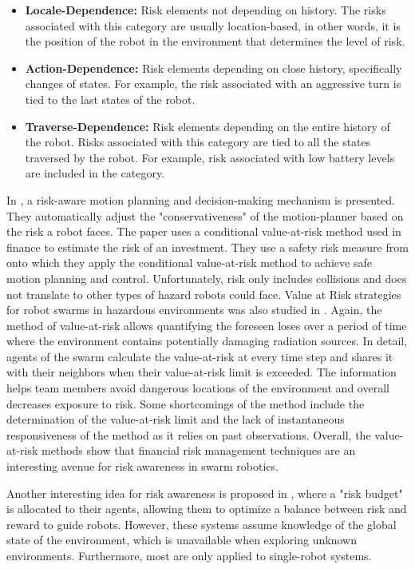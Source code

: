 \begin{itemize}
    \item \textbf{Locale-Dependence:} Risk elements not depending on history. The risks associated with this category are usually location-based, in other words, it is the position of the robot in the environment that determines the level of risk. 
    \item \textbf{Action-Dependence:} Risk elements depending on close history, specifically changes of states. For example, the risk associated with an aggressive turn is tied to the last states of the robot.   
    \item \textbf{Traverse-Dependence:} Risk elements depending on the entire history of the robot. Risks associated with this category are tied to all the states traversed by the robot. For example, risk associated with low battery levels are included in the category.  
\end{itemize}

In \cite{hakobyan2019risk}, a risk-aware motion planning and decision-making mechanism is presented. They automatically adjust the "conservativeness" of the motion-planner based on the risk a robot faces. The paper uses a conditional value-at-risk method used in finance to estimate the risk of an investment. They use a safety risk measure from \cite{samuelson2018safety} onto which they apply the conditional value-at-risk method to achieve safe motion planning and control. Unfortunately, risk only includes collisions and does not translate to other types of hazard robots could face. Value at Risk strategies for robot swarms in hazardous environments was also studied in \cite{hunt2021value}. Again, the method of value-at-risk allows quantifying the foreseen loses over a period of time where the environment contains potentially damaging radiation sources. In detail, agents of the swarm calculate the value-at-risk at every time step and shares it with their neighbors when their value-at-risk limit is exceeded. The information helps team members avoid dangerous locations of the environment and overall decreases exposure to risk. Some shortcomings of the method include the determination of the value-at-risk limit and the lack of instantaneous responsiveness of the method as it relies on past observations. Overall, the value-at-risk methods show that financial risk management techniques are an interesting avenue for risk awareness in swarm robotics.

Another interesting idea for risk awareness is proposed in \cite{ono2008efficient,vitus2011feedback}, where a "risk budget" is allocated to their agents, allowing them to optimize a balance between risk and reward to guide robots. However, these systems assume knowledge of the global state of the environment, which is unavailable when exploring unknown environments. Furthermore, most are only applied to single-robot systems. 

